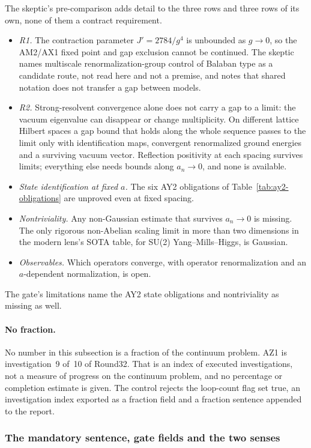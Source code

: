 The skeptic's pre-comparison adds detail to the three rows and three rows of
its own, none of them a contract requirement.
\begin{itemize}
\item \emph{R1.} The contraction parameter $J'=2784/g^4$ is unbounded as
 $g\to0$, so the AM2/AX1 fixed point and gap exclusion cannot be continued.
 The skeptic names multiscale renormalization-group control of Balaban type
 as a candidate route, not read here and not a premise, and notes that shared
 notation does not transfer a gap between models.
\item \emph{R2.} Strong-resolvent convergence alone does not carry a gap to a
 limit: the vacuum eigenvalue can disappear or change multiplicity. On
 different lattice Hilbert spaces a gap bound that holds along the whole
 sequence passes to the limit only with identification maps, convergent
 renormalized ground energies and a surviving vacuum vector.
 Reflection positivity at each spacing survives limits; everything else needs
 bounds along $a_n\to0$, and none is available.
\item \emph{State identification at fixed $a$.} The six AY2 obligations of
 Table~\ref{tab:ay2-obligations} are unproved even at fixed spacing.
\item \emph{Nontriviality.} Any non-Gaussian estimate that survives
 $a_n\to0$ is missing. The only rigorous non-Abelian scaling limit in more
 than two dimensions in the modern lens's SOTA table, for SU(2)
 Yang--Mills--Higgs, is Gaussian.
\item \emph{Observables.} Which operators converge, with operator
 renormalization and an $a$-dependent normalization, is open.
\end{itemize}
The gate's limitations name the AY2 state obligations and nontriviality as
missing as well.

\paragraph{No fraction.}
No number in this subsection is a fraction of the continuum problem. AZ1 is
investigation~9 of~10 of Round32. That is an index of executed
investigations, not a measure of progress on the continuum problem, and no
percentage or completion estimate is given. The control
 rejects the loop-count flag set true, an
investigation index exported as a fraction field and a fraction sentence
appended to the report.

\subsubsection{The mandatory sentence, gate fields and the two senses}
\label{sec:az1-sentence}
